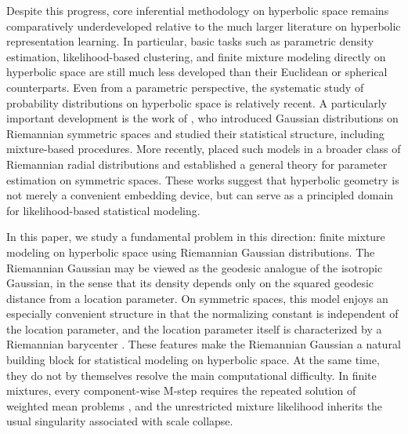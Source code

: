 \documentclass[11pt]{article}
\begin{document}
Despite this progress, core inferential methodology on hyperbolic space remains comparatively underdeveloped relative to the much larger literature on hyperbolic representation learning. In particular, basic tasks such as parametric density estimation, likelihood-based clustering, and finite mixture modeling directly on hyperbolic space are still much less developed than their Euclidean or spherical counterparts. Even from a parametric perspective, the systematic study of probability distributions on hyperbolic space is relatively recent. A particularly important development is the work of \cite{said_2018_GaussianDistributionsRiemannian}, who introduced Gaussian distributions on Riemannian symmetric spaces and studied their statistical structure, including mixture-based procedures. More recently, \cite{chen_2024_RiemannianRadialDistributions} placed such models in a broader class of Riemannian radial distributions and established a general theory for parameter estimation on symmetric spaces. These works suggest that hyperbolic geometry is not merely a convenient embedding device, but can serve as a principled domain for likelihood-based statistical modeling.

In this paper, we study a fundamental problem in this direction: finite mixture modeling on hyperbolic space using Riemannian Gaussian distributions. The Riemannian Gaussian may be viewed as the geodesic analogue of the isotropic Gaussian, in the sense that its density depends only on the squared geodesic distance from a location parameter. On symmetric spaces, this model enjoys an especially convenient structure in that the normalizing constant is independent of the location parameter, and the location parameter itself is characterized by a Riemannian barycenter \citep{said_2018_GaussianDistributionsRiemannian, chen_2024_RiemannianRadialDistributions}. These features make the Riemannian Gaussian a natural building block for statistical modeling on hyperbolic space. At the same time, they do not by themselves resolve the main computational difficulty. In finite mixtures, every component-wise M-step requires the repeated solution of weighted \Frechet mean problems \citep{frechet_1948_ElementsAleatoiresNature}, and the unrestricted mixture likelihood inherits the usual singularity associated with scale collapse.
\end{document}

